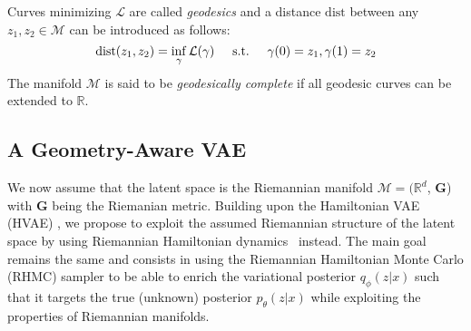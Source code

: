 \documentclass[10pt,journal,compsoc]{IEEEtran}
\begin{document}
Curves minimizing $\mathcal{L}$ are called \textit{geodesics} and a distance $\mathrm{dist}$ between any $z_1, z_2 \in \mathcal{M}$ can be introduced as follows:
\begin{equation}\label{Eq: geodesic distance}
    \mathrm{dist}(z_1, z_2) = \inf_{\gamma} \mathcal{L}(\gamma) \hspace{5mm} \mathrm{s.t.} \hspace{5mm} \gamma(0) = z_1, \gamma(1) = z_2
\end{equation}
The manifold $\mathcal{M}$ is said to be \textit{geodesically complete} if all geodesic curves can be extended to $\mathbb{R}$. 

\subsection{A Geometry-Aware VAE}

    We now assume that the latent space is the Riemannian manifold $\mathcal{M}=(\mathbb{R}^d$, $\mathbf{G}$) with $\mathbf{G}$ being the Riemanian metric. Building upon the Hamiltonian VAE (HVAE) \cite{caterini_hamiltonian_2018}, we propose to exploit the assumed Riemannian structure of the latent space by using Riemannian Hamiltonian dynamics~\cite{girolami_riemann_2011} instead. The main goal remains the same and consists in using the Riemannian Hamiltonian Monte Carlo (RHMC) sampler to be able to enrich the variational posterior $q_{\phi}(z|x)$ such that it targets the true (unknown) posterior $p_{\theta}(z|x)$ while exploiting the properties of Riemannian manifolds. 
    
\end{document}
